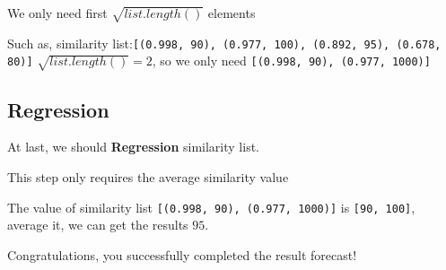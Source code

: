 \documentclass{article}
\begin{document}
We only need first $\sqrt{list. length()}$ elements


Such as, similarity list:\verb|[(0.998, 90), (0.977, 100), (0.892, 95), (0.678, 80)]|
$\sqrt{list.length()} = 2$, so we only need
\verb|[(0.998, 90), (0.977, 1000)]|

\subsection{Regression}
At last, we should \textbf{Regression} similarity list.


This step only requires the average similarity value


The value of similarity list \verb|[(0.998, 90), (0.977, 1000)]| is
\verb|[90, 100]|, average it, we can get the results
$95$.


Congratulations, you successfully completed the result forecast!
\end{document}
